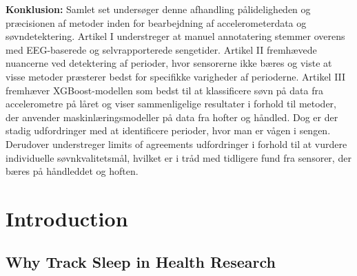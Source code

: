\documentclass[
  10pt,
]{scrbook}
\let\originaltextbf\textbf
\renewcommand{\textbf}[1]{\textcolor{color1}{\originaltextbf{#1}}}
\begin{document}
\textbf{Konklusion:} Samlet set undersøger denne afhandling
pålideligheden og præcisionen af metoder inden for bearbejdning af
accelerometerdata og søvndetektering. Artikel I understreger at manuel
annotatering stemmer overens med EEG-baserede og selvrapporterede
sengetider. Artikel II fremhævede nuancerne ved detektering af perioder,
hvor sensorerne ikke bæres og viste at visse metoder præsterer bedst for
specifikke varigheder af perioderne. Artikel III fremhæver
XGBoost-modellen som bedst til at klassificere søvn på data fra
accelerometre på låret og viser sammenligelige resultater i forhold til
metoder, der anvender maskinlæringsmodeller på data fra hofter og
håndled. Dog er der stadig udfordringer med at identificere perioder,
hvor man er vågen i sengen. Derudover understreger limits of agreements
udfordringer i forhold til at vurdere individuelle søvnkvalitetsmål,
hvilket er i tråd med tidligere fund fra sensorer, der bæres på
håndleddet og hoften.

\hypertarget{introduction}{%
\chapter{Introduction}\label{introduction}}

\hypertarget{why-track-sleep-in-health-research}{%
\section{Why Track Sleep in Health
Research}\label{why-track-sleep-in-health-research}}
\end{document}
